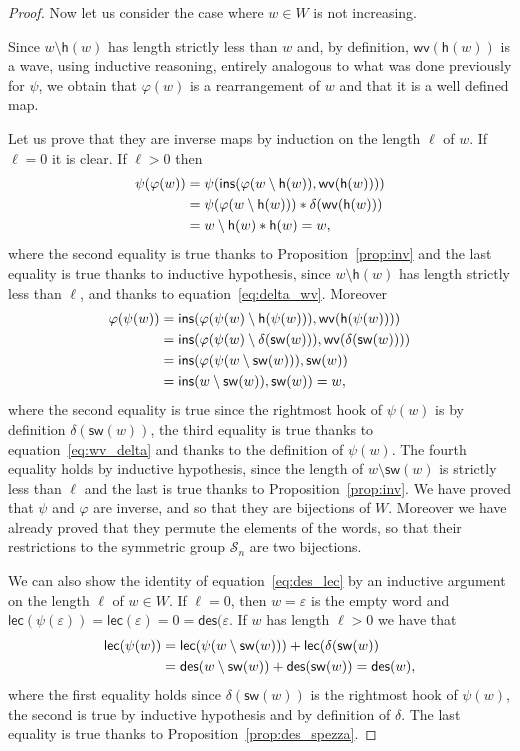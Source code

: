 \documentclass[a4paper]{amsart}
\newcommand{\des}{\mathsf{des}}
\newcommand{\lec}{\mathsf{lec}}
\newcommand{\sw}{\mathsf{sw}}
\newcommand{\ins}{\mathsf{ins}}
\newcommand{\h}{\mathsf{h}}
\newcommand{\wv}{\mathsf{wv}}
\theoremstyle{definition}
\theoremstyle{remark}
\numberwithin{equation}{section}
\begin{document}
\begin{proof}
Now let us consider the case where $w\in W$ is not increasing.

Since $w\setminus\h(w)$ has length strictly less than $w$ and, by definition, $\wv(\h(w))$ is a wave, using inductive reasoning, entirely analogous to what was done previously for $\psi$, we obtain that $\varphi(w)$ is a rearrangement of $w$ and that it is a well defined map. 

Let us prove that they are inverse maps by induction on the length $\ell$ of $w$. If $\ell=0$ it is clear. If $\ell>0$ then
\begin{align}
\psi(\varphi(w))&=\psi(\ins(\varphi(w\setminus\h(w)),\wv(\h(w))))\notag\\
&=\psi(\varphi(w\setminus\h(w)))*\delta(\wv(\h(w)))\\
&=w\setminus\h(w)*\h(w)=w,\notag
\end{align}
where the second equality is true thanks to Proposition~\ref{prop:inv} and the last equality is true thanks to inductive hypothesis, since $w\setminus\h(w)$ has length strictly less than $\ell$, and thanks to equation~\eqref{eq:delta_wv}. Moreover
\begin{align}
    \varphi(\psi(w))&=\ins(\varphi(\psi(w)\setminus\h(\psi(w))),\wv(\h(\psi(w))))\notag\\
    &=\ins(\varphi(\psi(w)\setminus\delta(\sw(w))),\wv(\delta(\sw(w))))\\
    &=\ins(\varphi(\psi(w\setminus\sw(w))),\sw(w))\notag\\
    &=\ins(w\setminus\sw(w)),\sw(w))=w\notag,
\end{align}
where the second equality is true since the rightmost hook of $\psi(w)$ is by definition $\delta(\sw(w))$, the third equality is true thanks to equation~\eqref{eq:wv_delta} and thanks to the definition of $\psi(w)$. The fourth equality holds by inductive hypothesis, since the length of $w\setminus\sw(w)$ is strictly less than $\ell$ and the last is true thanks to Proposition~\ref{prop:inv}. We have proved that $\psi$ and $\varphi$ are inverse, and so that they are bijections of $W$. Moreover we have already proved that they permute the elements of the words, so that their restrictions to the symmetric group $\mathcal{S}_n$ are two bijections.

We can also show the identity of equation~\eqref{eq:des_lec} by an inductive argument on the length $\ell$ of $w\in W$. If $\ell=0$, then $w=\varepsilon$ is the empty word and $\lec(\psi(\varepsilon))=\lec(\varepsilon)=0=\des(\varepsilon$. If $w$ has length $\ell>0$ we have that
\begin{align}
    \lec(\psi(w))&=\lec(\psi(w\setminus\sw(w)))+\lec(\delta(\sw(w))\notag\\
    &=\des(w\setminus\sw(w))+\des(\sw(w))=\des(w),
\end{align}
where the first equality holds since $\delta(\sw(w))$ is the rightmost hook of $\psi(w)$, the second is true by inductive hypothesis and by definition of $\delta$. The last equality is true thanks to Proposition~\ref{prop:des_spezza}.
\end{proof}
\end{document}
